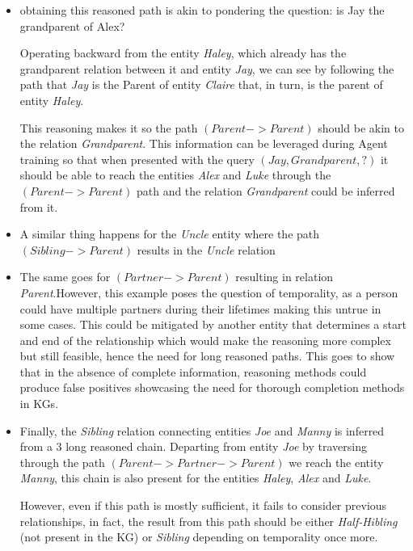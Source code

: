 \begin{itemize}
    \item obtaining this reasoned path is akin to pondering the question: is Jay the grandparent of Alex?
    
    Operating backward from the entity \textit{Haley}, which already has the grandparent relation between it and entity \textit{Jay}, we can see by following the path that \textit{Jay} is the Parent of entity \textit{Claire} that, in turn, is the parent of entity \textit{Haley}.

    This reasoning makes it so the path $(Parent -> Parent)$ should be akin to the relation \textit{Grandparent}. This information can be leveraged during Agent training so that when presented with the query $(Jay, Grandparent, ?)$ it should be able to reach the entities \textit{Alex} and \textit{Luke} through the $(Parent -> Parent)$ path and the relation \textit{Grandparent} could be inferred from it.

    \item A similar thing happens for the \textit{Uncle} entity where the path $(Sibling -> Parent)$ results in the \textit{Uncle} relation
    
    \item The same goes for $(Partner -> Parent)$ resulting in relation \textit{Parent}.However, this example poses the question of temporality, as a person could have multiple partners during their lifetimes making this untrue in some cases. 
    This could be mitigated by another entity that determines a start and end of the relationship which would make the reasoning more complex but still feasible, hence the need for long reasoned paths. This goes to show that in the absence of complete information, reasoning methods could produce false positives showcasing the need for thorough completion methods in KGs.

    \item Finally, the \textit{Sibling} relation connecting entities \textit{Joe} and \textit{Manny} is inferred from a 3 long reasoned chain. Departing from entity \textit{Joe} by traversing through the path $(Parent -> Partner -> Parent)$ we reach the entity \textit{Manny}, this chain is also present for the entities \textit{Haley}, \textit{Alex} and \textit{Luke}.
    
    However, even if this path is mostly sufficient, it fails to consider previous relationships, in fact, the result from this path should be either \textit{Half-Hibling} (not present in the KG) or \textit{Sibling} depending on temporality once more.


\end{itemize}
